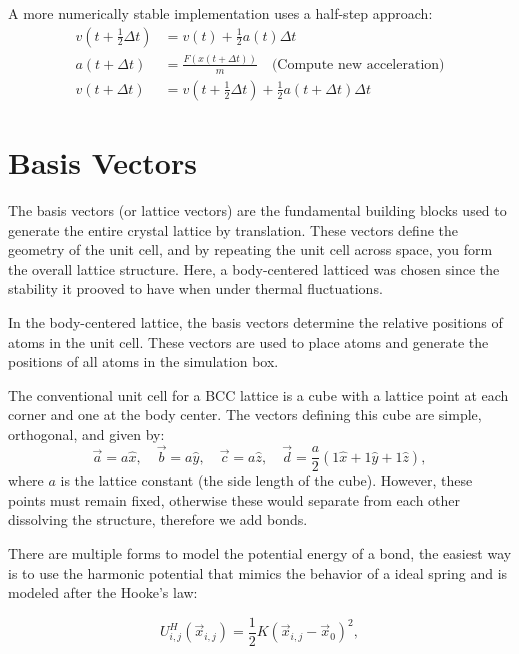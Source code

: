 A more numerically stable implementation uses a half-step approach:
\begin{align}
    v(t+\tfrac{1}{2}\Delta t) &= v(t) + \frac{1}{2}a(t)\Delta t \\
    a(t+\Delta t) &= \frac{F(x(t+\Delta t))}{m} \quad \text{(Compute new acceleration)} \\
    v(t+\Delta t) &= v(t+\tfrac{1}{2}\Delta t) + \frac{1}{2}a(t+\Delta t)\Delta t
    \label{eq:vv_velocity_halfstep}
\end{align}

\section{Basis Vectors}

The basis vectors (or lattice vectors) are the fundamental building blocks used to generate the entire crystal lattice by translation. These vectors define the geometry of the unit cell, and by repeating the unit cell across space, you form the overall lattice structure. Here, a body-centered latticed was chosen since the stability it prooved to have when under thermal fluctuations.

In the body-centered lattice, the basis vectors determine the relative positions of atoms in the unit cell. These vectors are used to place atoms and generate the positions of all atoms in the simulation box.


The conventional unit cell for a BCC lattice is a cube with a lattice point at each corner and one at the body center. The vectors defining this cube are simple, orthogonal, and given by:
%
\begin{equation}
  \vec{a} = a\hat{x}, \quad \vec{b} = a\hat{y}, \quad \vec{c} = a\hat{z}, \quad \vec{d} = \frac{a}{2}\left(  1\hat{x} +  1\hat{y} + 1\hat{z} \right), 
\end{equation}
%
where \( a \) is the lattice constant (the side length of the cube). However, these points must remain fixed, otherwise these would separate from each other dissolving the structure, therefore we add bonds.

There are multiple forms to model the potential energy of a bond, the easiest way is to use the harmonic potential that mimics the behavior of a ideal spring and is modeled after the Hooke's law:

\begin{equation}
  U^{H}_{i,j}(\vec{x}_{i,j}) = \frac{1}{2}K(\vec{x}_{i,j} - \vec{x}_0)^2,
\end{equation}

